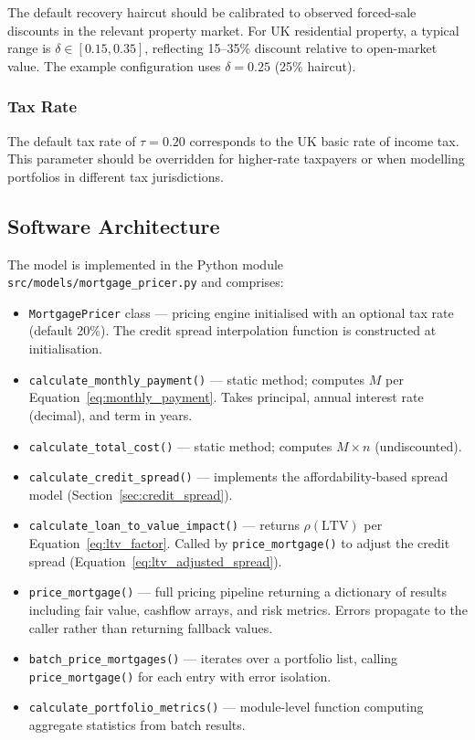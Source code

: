 \documentclass[11pt,a4paper]{article}
\begin{document}
The default recovery haircut should be calibrated to observed forced-sale discounts in
the relevant property market. For UK residential property, a typical range is
$\delta \in [0.15, 0.35]$, reflecting 15--35\% discount relative to open-market value.
The example configuration uses $\delta = 0.25$ (25\% haircut).

\subsubsection{Tax Rate}

The default tax rate of $\tau = 0.20$ corresponds to the UK basic rate of income tax.
This parameter should be overridden for higher-rate taxpayers or when modelling
portfolios in different tax jurisdictions.

\mkmimplementation

\subsection{Software Architecture}

The model is implemented in the Python module \texttt{src/models/mortgage\_pricer.py}
and comprises:

\begin{itemize}[nosep]
    \item \texttt{MortgagePricer} class --- pricing engine initialised with an optional
          tax rate (default 20\%). The credit spread interpolation function is constructed
          at initialisation.
    \item \texttt{calculate\_monthly\_payment()} --- static method; computes $M$ per
          Equation~\eqref{eq:monthly_payment}. Takes principal, annual interest rate
          (decimal), and term in years.
    \item \texttt{calculate\_total\_cost()} --- static method; computes $M \times n$
          (undiscounted).
    \item \texttt{calculate\_credit\_spread()} --- implements the affordability-based
          spread model (Section~\ref{sec:credit_spread}).
    \item \texttt{calculate\_loan\_to\_value\_impact()} --- returns $\rho(\text{LTV})$
          per Equation~\eqref{eq:ltv_factor}. Called by \texttt{price\_mortgage()} to
          adjust the credit spread (Equation~\eqref{eq:ltv_adjusted_spread}).
    \item \texttt{price\_mortgage()} --- full pricing pipeline returning a dictionary
          of results including fair value, cashflow arrays, and risk metrics. Errors
          propagate to the caller rather than returning fallback values.
    \item \texttt{batch\_price\_mortgages()} --- iterates over a portfolio list,
          calling \texttt{price\_mortgage()} for each entry with error isolation.
    \item \texttt{calculate\_portfolio\_metrics()} --- module-level function computing
          aggregate statistics from batch results.
\end{itemize}
\end{document}
